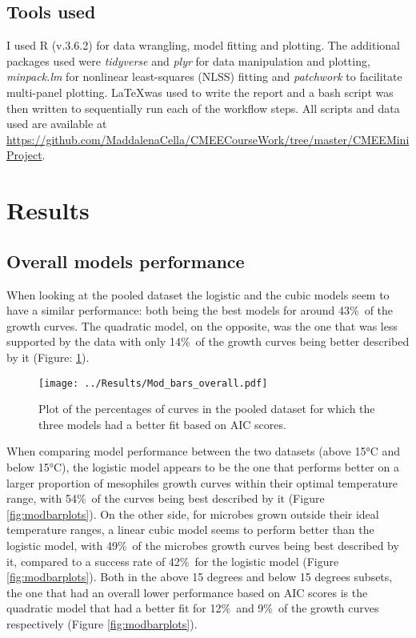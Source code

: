 \documentclass[a4paper]{article}
\begin{document}
    \subsection{Tools used}
    I used R (v.3.6.2) \citep{Rcit} for data wrangling, model fitting and plotting. The additional packages used were \textit{tidyverse} \citep{tidyverse} and \textit{plyr} for data manipulation and plotting, \textit{minpack.lm} \citep{minpack.lm} for nonlinear least-squares (NLSS) fitting and \textit{patchwork} \citep{patchwork} to facilitate multi-panel plotting.
	\LaTeX was used to write the report and a bash script was then written to sequentially run each of the workflow steps. All scripts and data used are available at \url{https://github.com/MaddalenaCella/CMEECourseWork/tree/master/CMEEMiniProject}.

\section{Results}

    \subsection{Overall models performance}
When looking at the pooled dataset the logistic and the cubic models seem to have a similar performance: both being the best models for around 43\%\ of the growth curves. The quadratic model, on the opposite, was the one that was less supported by the data with only 14\%\ of the growth curves being better described by it (Figure: \ref{fig:overallbarplots}).

\begin{figure}
    \centering
    \texttt{[image: ../Results/Mod\_bars\_overall.pdf]}
\caption{Plot of the percentages of curves in the pooled dataset for which the three models had a better fit based on AIC scores.}
    \label{fig:overallbarplots}
\end{figure}

When comparing model performance between the two datasets (above 15°C and below 15°C), the logistic model appears to be the one that performs better on a larger proportion of mesophiles growth curves within their optimal temperature range, with 54\%\ of the curves being best described by it (Figure \ref{fig:modbarplots}). On the other side, for microbes grown outside their ideal temperature ranges, a linear cubic model seems to perform better than the logistic model, with 49\%\ of the microbes growth curves being best described by it, compared to a success rate of 42\%\ for the logistic model (Figure \ref{fig:modbarplots}). 
Both in the above 15 degrees and below 15 degrees subsets, the one that had an overall lower performance based on AIC scores is the quadratic model that had a better fit for 12\%\ and 9\%\ of the growth curves respectively (Figure \ref{fig:modbarplots}). \par
\end{document}
